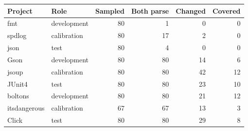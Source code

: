 \begin{tabular}{llrrrr}
\toprule
Project & Role & Sampled & Both parse & Changed & Covered \\
\midrule
fmt & development & 80 & 1 & 0 & 0 \\
spdlog & calibration & 80 & 17 & 2 & 0 \\
json & test & 80 & 4 & 0 & 0 \\
Gson & development & 80 & 80 & 14 & 6 \\
jsoup & calibration & 80 & 80 & 42 & 12 \\
JUnit4 & test & 80 & 80 & 23 & 10 \\
boltons & development & 80 & 80 & 21 & 12 \\
itsdangerous & calibration & 67 & 67 & 13 & 3 \\
Click & test & 80 & 80 & 29 & 8 \\
\bottomrule
\end{tabular}
